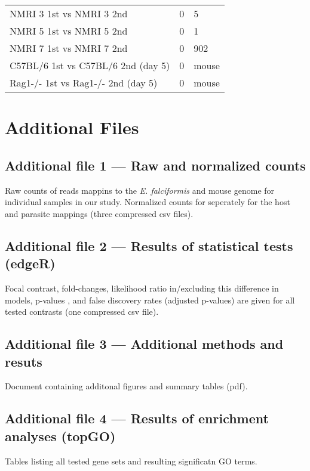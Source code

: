 \documentclass{bmcart}
\begin{document}
\begin{backmatter}
\begin{table}[H]
\begin{center}
\begin{tabular}{*3l}
	NMRI 3 1st vs NMRI 3 2nd  	& 0  & 5 \\
	NMRI 5 1st vs NMRI 5 2nd  	& 0  & 1 \\
	NMRI 7 1st vs NMRI 7 2nd  	& 0  & 902 \\
	C57BL/6 1st vs C57BL/6 2nd (day 5) & 0 &  mouse \\
	Rag1-/- 1st vs Rag1-/- 2nd (day 5) & 0 & mouse  \\ \midrule
\bottomrule
	\hline
\end{tabular}
\end{center}
\end{table}





\section*{Additional Files}
  \subsection*{Additional file 1 --- Raw and normalized counts }
  Raw counts of reads mappins to the \textit{E. falciformis} and mouse
  genome for individual samples in our study. Normalized counts for
  seperately for the host and parasite mappings (three compressed csv
  files).
  
  \subsection*{Additional file 2 --- Results of statistical tests (edgeR) }
  Focal contrast, fold-changes, likelihood ratio in/excluding this
  difference in models, p-values , and false discovery rates (adjusted
  p-values) are given for all tested contrasts (one compressed csv
  file).
  
  \subsection*{Additional file 3 --- Additional methods and resuts }
  Document containing additonal figures and summary tables (pdf).

\subsection*{Additional file 4 --- Results of enrichment analyses (topGO)}
  Tables listing all tested gene sets and resulting significatn GO
  terms.
  
  
\end{backmatter}
\end{document}
